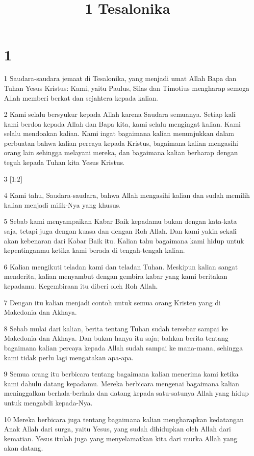 

\title{1 Tesalonika}


\chapter{1}

\par 1 Saudara-saudara jemaat di Tesalonika, yang menjadi umat Allah Bapa dan Tuhan Yesus Kristus: Kami, yaitu Paulus, Silas dan Timotius mengharap semoga Allah memberi berkat dan sejahtera kepada kalian.
\par 2 Kami selalu bersyukur kepada Allah karena Saudara semuanya. Setiap kali kami berdoa kepada Allah dan Bapa kita, kami selalu mengingat kalian. Kami selalu mendoakan kalian. Kami ingat bagaimana kalian menunjukkan dalam perbuatan bahwa kalian percaya kepada Kristus, bagaimana kalian mengasihi orang lain sehingga melayani mereka, dan bagaimana kalian berharap dengan teguh kepada Tuhan kita Yesus Kristus.
\par 3 [1:2]
\par 4 Kami tahu, Saudara-saudara, bahwa Allah mengasihi kalian dan sudah memilih kalian menjadi milik-Nya yang khusus.
\par 5 Sebab kami menyampaikan Kabar Baik kepadamu bukan dengan kata-kata saja, tetapi juga dengan kuasa dan dengan Roh Allah. Dan kami yakin sekali akan kebenaran dari Kabar Baik itu. Kalian tahu bagaimana kami hidup untuk kepentinganmu ketika kami berada di tengah-tengah kalian.
\par 6 Kalian mengikuti teladan kami dan teladan Tuhan. Meskipun kalian sangat menderita, kalian menyambut dengan gembira kabar yang kami beritakan kepadamu. Kegembiraan itu diberi oleh Roh Allah.
\par 7 Dengan itu kalian menjadi contoh untuk semua orang Kristen yang di Makedonia dan Akhaya.
\par 8 Sebab mulai dari kalian, berita tentang Tuhan sudah tersebar sampai ke Makedonia dan Akhaya. Dan bukan hanya itu saja; bahkan berita tentang bagaimana kalian percaya kepada Allah sudah sampai ke mana-mana, sehingga kami tidak perlu lagi mengatakan apa-apa.
\par 9 Semua orang itu berbicara tentang bagaimana kalian menerima kami ketika kami dahulu datang kepadamu. Mereka berbicara mengenai bagaimana kalian meninggalkan berhala-berhala dan datang kepada satu-satunya Allah yang hidup untuk mengabdi kepada-Nya.
\par 10 Mereka berbicara juga tentang bagaimana kalian mengharapkan kedatangan Anak Allah dari surga, yaitu Yesus, yang sudah dihidupkan oleh Allah dari kematian. Yesus itulah juga yang menyelamatkan kita dari murka Allah yang akan datang.

